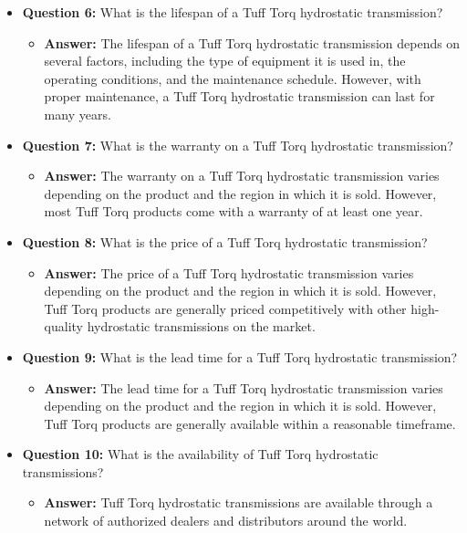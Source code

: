 \documentclass{article}
\begin{document}
\begin{itemize}
    \item \textbf{Question 6:} What is the lifespan of a Tuff Torq hydrostatic transmission?
    \begin{itemize}
        \item \textbf{Answer:} The lifespan of a Tuff Torq hydrostatic transmission depends on several factors, including the type of equipment it is used in, the operating conditions, and the maintenance schedule. However, with proper maintenance, a Tuff Torq hydrostatic transmission can last for many years.
    \end{itemize}
    
    \item \textbf{Question 7:} What is the warranty on a Tuff Torq hydrostatic transmission?
    \begin{itemize}
        \item \textbf{Answer:} The warranty on a Tuff Torq hydrostatic transmission varies depending on the product and the region in which it is sold. However, most Tuff Torq products come with a warranty of at least one year.
    \end{itemize}
    
    \item \textbf{Question 8:} What is the price of a Tuff Torq hydrostatic transmission?
    \begin{itemize}
        \item \textbf{Answer:} The price of a Tuff Torq hydrostatic transmission varies depending on the product and the region in which it is sold. However, Tuff Torq products are generally priced competitively with other high-quality hydrostatic transmissions on the market.
    \end{itemize}
    
    \item \textbf{Question 9:} What is the lead time for a Tuff Torq hydrostatic transmission?
    \begin{itemize}
        \item \textbf{Answer:} The lead time for a Tuff Torq hydrostatic transmission varies depending on the product and the region in which it is sold. However, Tuff Torq products are generally available within a reasonable timeframe.
    \end{itemize}
    
    \item \textbf{Question 10:} What is the availability of Tuff Torq hydrostatic transmissions?
    \begin{itemize}
        \item \textbf{Answer:} Tuff Torq hydrostatic transmissions are available through a network of authorized dealers and distributors around the world.
    \end{itemize}
    

\end{itemize}
\end{document}
